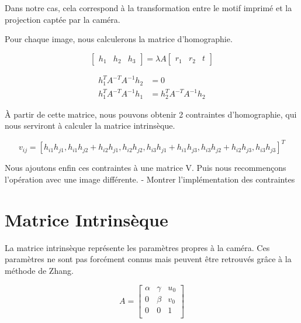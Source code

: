 \documentclass{article}
\begin{document}
Dans notre cas, cela correspond à la transformation entre le motif imprimé et la projection captée par la caméra.

Pour chaque image, nous calculerons la matrice d'homographie.

\begin{equation}
  \begin{bmatrix}
    h_1 & h_2 & h_3
  \end{bmatrix}
  = \lambda A
  \begin{bmatrix}
    r_1 & r_2 & t
  \end{bmatrix}
\end{equation}

\begin{equation}
  \begin{aligned}
    h_1^T A^{-T} A^{-1} h_2 &= 0 \\
    h_1^T A^{-T} A^{-1} h_1 &= h_2^T A^{-T} A^{-1} h_2
  \end{aligned}
\end{equation}

À partir de cette matrice, nous pouvons obtenir 2 contraintes d'homographie, qui nous serviront à calculer la matrice intrinsèque.

\begin{equation}
  v_{ij} = [h_{i1} h_{j1} , h_{i1} h_{j2} + h_{i2} h_{j1} , h_{i2} h_{j2} ,
h_{i3} h_{j1} + h_{i1} h_{j3} , h_{i3} h_{j2} + h_{i2} h_{j3} , h_{i3} h_{j3} ]^T
\end{equation}

Nous ajoutons enfin ces contraintes à une matrice V. Puis nous recommençons l'opération avec une image différente.
- Montrer l'implémentation des contraintes


\section{Matrice Intrinsèque}

La matrice intrinsèque représente les paramètres propres à la caméra. Ces paramètres ne sont pas forcément connus mais peuvent être retrouvés grâce à la méthode de Zhang.

\begin{equation}
  A=
  \begin{bmatrix}
   \alpha & \gamma & u_0 \\
   0 & \beta & v_0 \\
   0 & 0 & 1 \\
  \end{bmatrix}
\end{equation}
\end{document}
